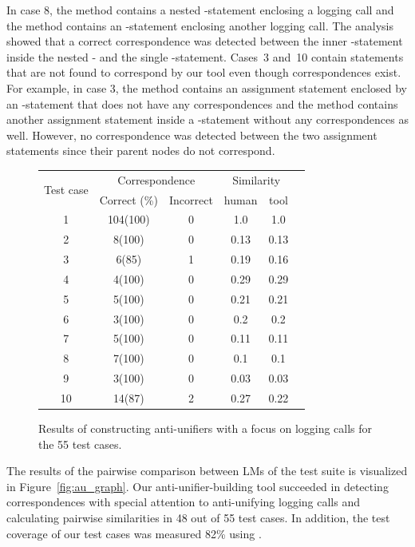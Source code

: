 In case 8, the  method contains a nested -statement enclosing a logging call and the  method contains an -statement enclosing another logging call. The analysis showed that a correct correspondence was detected between the inner -statement inside the nested - and the single -statement. Cases~3 and~10 contain statements that are not found to correspond by our tool even though correspondences exist. For example, in case 3, the  method contains an assignment statement enclosed by an -statement that does not have any correspondences and the  method contains another assignment statement inside a -statement without any correspondences as well. However, no correspondence was detected between the two assignment statements since their parent nodes do not correspond.
\begin{figure}
  \centering
  \begin{tabular}{|c|c|c|c|c|c|}
    \hline
    \multirow{2}{*}{Test case}&\multicolumn{2}{c|}{Correspondence}&\multicolumn{2}{c|}{Similarity}\\
    \cline{2-5}
    &Correct (\%)&Incorrect&human&tool\\
    \hline
    1&104(100)&0& 1.0 & 1.0\\
    \hline
    2&8(100)&0& 0.13& 0.13\\
    \hline
    3&6(85)&1&0.19& 0.16\\
    \hline
    4&4(100)&0&0.29 &0.29\\
    \hline
    5&5(100)&0&0.21 &0.21\\
    \hline
    6&3(100)&0&0.2 &0.2\\
    \hline
    7&5(100)&0&0.11 &0.11\\
    \hline
    8&7(100)&0& 0.1&0.1\\
    \hline
    9&3(100)&0&0.03&0.03 \\
    \hline
    10&14(87)&2&0.27 &0.22\\
    \hline

  \end{tabular}
  \caption{Results of constructing anti-unifiers with a focus on logging calls for the 55 test cases.}

  \label{study2_test_cases_results}
\end{figure}

The results of the pairwise comparison between LMs of the test suite is visualized in Figure~\ref{fig:au_graph}. Our anti-unifier-building tool succeeded in detecting correspondences with special attention to anti-unifying logging calls and calculating pairwise similarities in 48 out of 55 test cases. In addition, the test coverage of our test cases was measured 82\% using .

